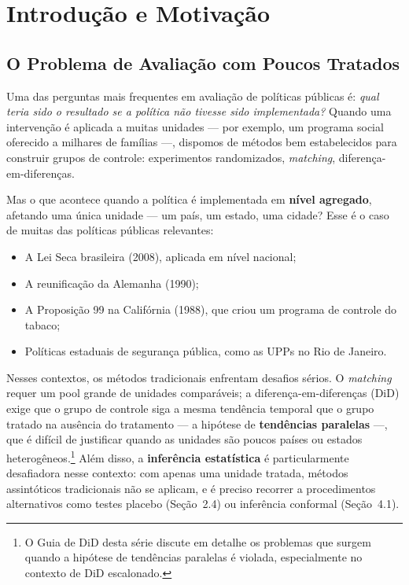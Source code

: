 \documentclass[12pt, a4paper, openany]{book}
\begin{document}
\tableofcontents
\newpage



\chapter{Introdução e Motivação}

\section{O Problema de Avaliação com Poucos Tratados}

Uma das perguntas mais frequentes em avaliação de políticas públicas é: \textit{qual teria sido o resultado se a política não tivesse sido implementada?} Quando uma intervenção é aplicada a muitas unidades --- por exemplo, um programa social oferecido a milhares de famílias ---, dispomos de métodos bem estabelecidos para construir grupos de controle: experimentos randomizados, \textit{matching}, diferença-em-diferenças.

Mas o que acontece quando a política é implementada em \textbf{nível agregado}, afetando uma única unidade --- um país, um estado, uma cidade? Esse é o caso de muitas das políticas públicas relevantes:
\begin{itemize}[leftmargin=1.5cm]
  \item A Lei Seca brasileira (2008), aplicada em nível nacional;
  \item A reunificação da Alemanha (1990);
  \item A Proposição 99 na Califórnia (1988), que criou um programa de controle do tabaco;
  \item Políticas estaduais de segurança pública, como as UPPs no Rio de Janeiro.
\end{itemize}

Nesses contextos, os métodos tradicionais enfrentam desafios sérios. O \textit{matching} requer um pool grande de unidades comparáveis; a diferença-em-diferenças (DiD) exige que o grupo de controle siga a mesma tendência temporal que o grupo tratado na ausência do tratamento --- a hipótese de \textbf{tendências paralelas} ---, que é difícil de justificar quando as unidades são poucos países ou estados heterogêneos.\footnote{O Guia de DiD desta série discute em detalhe os problemas que surgem quando a hipótese de tendências paralelas é violada, especialmente no contexto de DiD escalonado.} Além disso, a \textbf{inferência estatística} é particularmente desafiadora nesse contexto: com apenas uma unidade tratada, métodos assintóticos tradicionais não se aplicam, e é preciso recorrer a procedimentos alternativos como testes placebo (Seção~2.4) ou inferência conformal (Seção~4.1).
\end{document}
